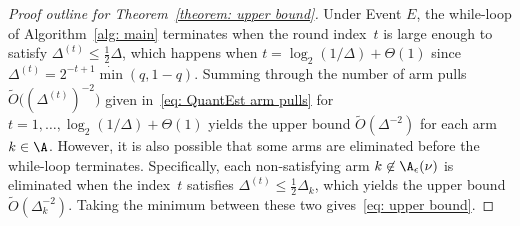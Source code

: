 \begin{proof}[Proof outline for Theorem~\ref{theorem: upper bound}]
    Under Event $E$, the while-loop of Algorithm~\ref{alg: main} terminates
    when the round index~$t$ is large enough to satisfy
    $\Delta^{(t)} \le \frac{1}{2} \Delta $,
    which happens when $t = \log_2 (1/\Delta ) + \Theta(1)$ since $\Delta^{(t)} = 2^{-t+1} \dot \min(q,1-q)$.
    Summing through the number of arm pulls $\widetilde{O}\big( \left(\Delta^{(t)}\right)^{-2}\big)$ given in~\eqref{eq: QuantEst arm pulls} for $t = 1, \ldots, \log_2 (1/\Delta ) + \Theta(1) $
    yields the upper bound $\widetilde{O}\left( \Delta ^{-2}\right)$ for each arm $k \in \A$.
    However, it is also possible that some arms are eliminated before the while-loop terminates.
    Specifically, each non-satisfying arm $k \not\in \A_{\epsilon}(\nu)$ is eliminated when the index~$t$ satisfies $\Delta^{(t)} \le \frac{1}{2} \Delta_{k}$,  which yields the upper bound $\widetilde{O}\left(\Delta_{k}^{-2}\right)$. Taking the minimum between these two gives~\eqref{eq: upper bound}.
\end{proof}

